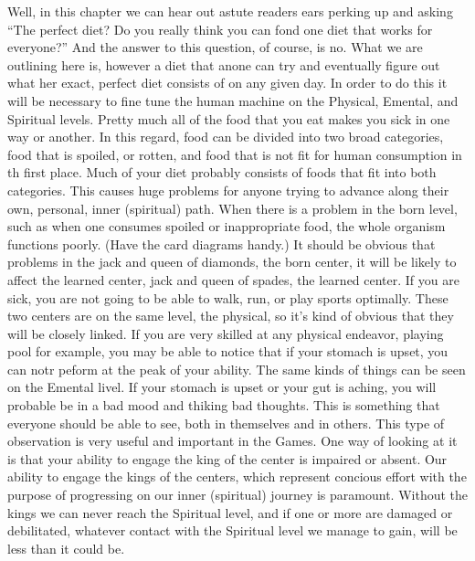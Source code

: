 \documentclass[12pt,letterpaper]{book}
\begin{document}
Well, in this chapter we can hear out astute readers ears perking up and asking ``The perfect diet? Do you really think you can fond one diet that works for everyone?'' And the answer to this question, of course, is no. What we are outlining here is, however a diet that anone can try and eventually figure out what her exact, perfect diet consists of on any given day. In order to do this it will be necessary to fine tune the human machine on the Physical, Emental, and Spiritual levels. Pretty much all of the food that you eat makes you sick in one way or another. In this regard, food can be divided into two broad categories, food that is spoiled, or rotten, and food that is not fit for human consumption in th first place. Much of your diet probably consists of foods that fit into both categories. This causes huge problems for anyone trying to advance along their own, personal, inner (spiritual) path. When there is a problem in the born level, such as when one consumes spoiled or inappropriate food, the whole organism functions poorly. (Have the card diagrams handy.) It should be obvious that problems in the jack and queen of diamonds, the born center, it will be likely to affect the learned center, jack and queen of spades, the learned center. If you are sick, you are not going to be able to walk, run, or play sports optimally. These two centers are on the same level, the physical, so it's kind of obvious that they will be closely linked. If you are very skilled at any physical endeavor, playing pool for example, you may be able to notice that if your stomach is upset, you can notr peform at the peak of your ability. The same kinds of things can be seen on the Emental livel. If your stomach is upset or your gut is aching, you will probable be in a bad mood and thiking bad thoughts. This is something that everyone should be able to see, both in themselves and in others. This type of observation is very useful and important in the Games. One way of looking at it is that your ability to engage the king of the center is impaired or absent. Our ability to engage the kings of the centers, which represent concious effort with the purpose of progressing on our inner (spiritual) journey is paramount. Without the kings we can never reach the Spiritual level, and if one or more are damaged or debilitated, whatever contact with the Spiritual level we manage to gain, will be less than it could be.
\end{document}
